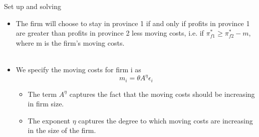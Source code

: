 \documentclass{beamer}
\begin{document}
\begin{frame}{Set up and solving}

\begin{itemize}
\item The firm will choose to stay in province 1 if and only if profits in province 1 are greater than profits in province 2 less moving costs, i.e. if $\pi _{f1}^{*}\geqslant \pi _{f2}^{*}-m $, where m is the firm's moving costs.\\~

\item We specify the moving costs for firm i as
\begin{equation}
m_i=\theta A^{\eta}\epsilon _i
\end{equation}

\begin{itemize}
\item The term $A^{\eta}$ captures the fact that the moving costs should be increasing in firm size.
\item The exponent  $\eta$  captures the degree to which moving costs are increasing in the size of the firm.

\end{itemize}

\end{itemize}

\end{frame}
\end{document}
